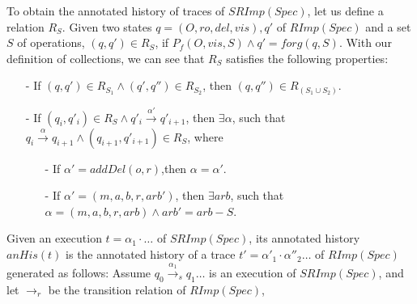 





To obtain the annotated history of traces of $SRImp(Spec)$, let us define a relation $R_S$. Given two states $q=(O,\mathit{ro},\mathit{del},\mathit{vis}),q'$ of $RImp(Spec)$ and a set $S$ of operations, $(q,q') \in R_S$, if $P_f(O,\mathit{vis},S) \wedge q' = forg(q,S)$. With our definition of collections, we can see that $R_S$ satisfies the following properties:

\begin{itemize}
\setlength{\itemsep}{0.5pt}
\item[-] If $(q,q') \in R_{ S_1 } \wedge (q',q'') \in R_{ S_2 }$, then $(q,q'') \in R_{ ( S_1 \cup S_2 ) }$.

\item[-] If $(q_i,q'_i) \in R_{S} \wedge q'_i {\xrightarrow{\alpha'}} q'_{i+1}$, then $\exists \alpha$, such that $q_i {\xrightarrow{\alpha}} q_{i+1} \wedge (q_{i+1},q'_{i+1}) \in R_{S}$, where

    \begin{itemize}
    \setlength{\itemsep}{0.5pt}
    \item[-] If $\alpha' = addDel(o,r)$,then $\alpha = \alpha'$.

    \item[-] If $\alpha'=(m,a,b,r,\mathit{arb}')$, then $\exists \mathit{arb}$, such that $\alpha=(m,a,b,r,\mathit{arb}) \wedge \mathit{arb}' = \mathit{arb} - S$.
    \end{itemize}
\end{itemize}


Given an execution $t = \alpha_1 \cdot \ldots$ of $SRImp(Spec)$, its annotated history $anHis(t)$ is the annotated history of a trace $t' = \alpha'_1 \cdot \alpha''_2 \ldots$ of $RImp(Spec)$ generated as follows: Assume $q_0 {\xrightarrow{\alpha_1}}_s q_1 \ldots$ is an execution of $SRImp(Spec)$, and let $\rightarrow_r$ be the transition relation of $RImp(Spec)$,

